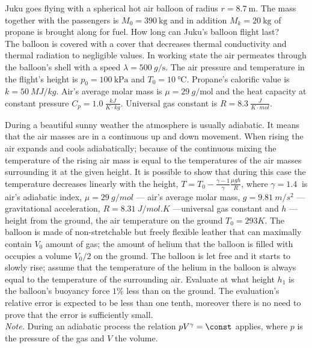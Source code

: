 \documentclass[11pt]{article}
\begin{document}

\probeng
Juku goes flying with a spherical hot air balloon of radius $r = \SI{8.7}{\metre}$. The mass together with the passengers is $M_0= \SI{390}{\kg}$ and in addition $M_k = \SI{20}{\kg}$ of propane is brought along for fuel. How long can Juku's balloon flight last?\\ 
The balloon is covered with a cover that decreases thermal conductivity and thermal radiation to negligible values. In working state the air permeates through the balloon's shell with a speed $\lambda = \SI{500}{g\per\s}$. The air pressure and temperature in the flight's height is $p_0 = \SI{100}{\kilo\Pa}$ and $T_0 = \SI{10}{\degreeCelsius}$. Propane's calorific value is $k = \SI{50}{MJ/kg}$. Air's average molar mass is $\mu = \SI{29}{g\per\mole}$ and the heat capacity at constant pressure $C_p = \SI{1.0}{\frac{kJ}{K\cdot kg}}$. Universal gas constant is $R = \SI{8.3}{\frac{J}{K\cdot mol}}$.
\probend
\bigskip


\probeng
During a beautiful sunny weather the atmosphere is usually adiabatic. It means that the air masses are in a continuous up and down movement. When rising the air expands and cools adiabatically; because of the continuous mixing the temperature of the rising air mass is equal to the temperatures of the air masses surrounding it at the given height. It is possible to show that during this case the temperature decreases linearly with the height, $T=T_0-\frac{\gamma-1}\gamma\frac{\mu g h}R$, where $\gamma=\SI{1.4}{	}$ is air's adiabatic index, $\mu=\SI{29}{g/mol}$ — air's average molar mass, $g=\SI{9.81}{m/s^2}$ — gravitational acceleration, $R=\SI{8.31}{J/mol.K}$ —universal gas constant and $h$ — height from the ground, the air temperature on the ground $T_0=\SI{293}K$. The balloon is made of non-stretchable but freely flexible leather that can maximally contain $V_0$ amount of gas; the amount of helium that the balloon is filled with occupies a volume $V_0/2$ on the ground. The balloon is let free and it starts to slowly rise; assume that the temperature of the helium in the balloon is always equal to the temperature of the surrounding air. Evaluate at what height $h_1$ is the balloon's buoyancy force $1\%$ less than on the ground. The evaluation's relative error is expected to be less than one tenth, moreover there is no need to prove that the error is sufficiently small.\\
\emph{Note.}  During an adiabatic process the relation $pV^\gamma = \const$ applies, where $p$ is the pressure of the gas and $V$ the volume.
\probend
\bigskip
\newpage\subsection{\protect{}}
\end{document}
